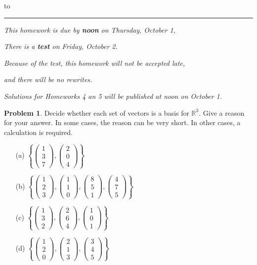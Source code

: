 \documentclass[11pt]{article}
\newcommand{\R}{{\mathbb R}}
\theoremstyle{definition}
\newtheorem{problem}{Problem}
\begin{document}
\hbox to 
\nointerlineskip
\vskip 2pt
\hrule height 1pt

\medskip

\centerline{\textit{This homework is due by \textbf{noon} on Thursday, October 1,}}
\centerline{\textit{There is a \textbf{test} on Friday, October 2.}}
\centerline{\textit{Because of the test, this homework will not be accepted late,}}
\centerline{\textit{and there will be no rewrites.}}
\centerline{\textit{Solutions for Homeworks 4 an 5 will be published at noon on October 1.}}

\medskip

\def\vc#1{\begin{pmatrix}#1\end{pmatrix}}


\begin{problem}
Decide whether each set of vectors is a basis for $\R^3$.  Give a reason for 
your answer.  In some cases, the reason can be very short.  In other cases, a
calculation is required.
\begin{enumerate}
  \item[(a)] $\left\{\vc{1 \\ 3 \\ 7},\vc{2 \\ 0 \\ 4}\right\}$
  \item[(b)] $\left\{\vc{1 \\ 2 \\ 3},\vc{1 \\ 1 \\ 0},\vc{8 \\ 5 \\ 1},\vc{4 \\ 7 \\ 5}\right\}$
  \item[(c)] $\left\{\vc{1 \\ 3 \\ 2},\vc{2 \\ 6 \\ 4},\vc{1 \\ 0 \\ 1}\right\}$
  \item[(d)] $\left\{\vc{1 \\ 2 \\ 0},\vc{2 \\ 1 \\ 3},\vc{3 \\ 4 \\ 5}\right\}$
\end{enumerate}
\end{problem}
\end{document}
